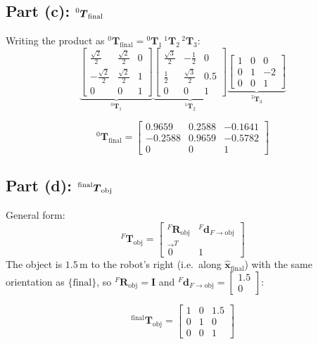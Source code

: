 \documentclass[11pt]{article}
\newcommand{\T}{\bm{T}}
\newcommand{\R}{\bm{R}}
\newcommand{\dvec}{\bm{d}}
\begin{document}
\subsection*{Part (c): $\prescript{0}{}{\T}_{\textrm{final}}$}
Writing the product as $^{0}\T_{\textrm{final}} = {}^{0}\T_1\,{}^{1}\T_2\,{}^{2}\T_3$:
\[
    \underbrace{\begin{bmatrix}\tfrac{\sqrt2}{2}&\tfrac{\sqrt2}{2}&0\\-\tfrac{\sqrt2}{2}&\tfrac{\sqrt2}{2}&1\\0&0&1\end{bmatrix}}_{^{0}\T_1}
    \underbrace{\begin{bmatrix}\tfrac{\sqrt3}{2}&-\tfrac12&0\\\tfrac12&\tfrac{\sqrt3}{2}&0.5\\0&0&1\end{bmatrix}}_{^{1}\T_2}
    \underbrace{\begin{bmatrix}1&0&0\\0&1&-2\\0&0&1\end{bmatrix}}_{^{2}\T_3}
\]
\begin{result}
\[
    ^{0}\T_{\textrm{final}} = \begin{bmatrix}0.9659 & 0.2588 & -0.1641 \\ -0.2588 & 0.9659 & -0.5782 \\ 0 & 0 & 1\end{bmatrix}
\]
\end{result}

\subsection*{Part (d): $\prescript{\textrm{final}}{}{\T}_{\textrm{obj}}$}
General form:
\[
    ^{F}\T_{\textrm{obj}} = \begin{bmatrix}^{F}\R_{\textrm{obj}} & ^{F}\dvec_{F\to\textrm{obj}} \\ \vec{0}^{T} & 1\end{bmatrix}
\]
The object is $1.5\,$m to the robot's right (i.e.\ along $\hat{\bm{x}}_{\textrm{final}}$) with the same orientation as $\{\textrm{final}\}$, so $^{F}\R_{\textrm{obj}}=\bm I$ and $^{F}\dvec_{F\to\textrm{obj}}=\begin{bmatrix}1.5\\0\end{bmatrix}$:
\begin{result}
\[
    ^{\textrm{final}}\T_{\textrm{obj}} = \begin{bmatrix}1 & 0 & 1.5 \\ 0 & 1 & 0 \\ 0 & 0 & 1\end{bmatrix}
\]
\end{result}
\end{document}

